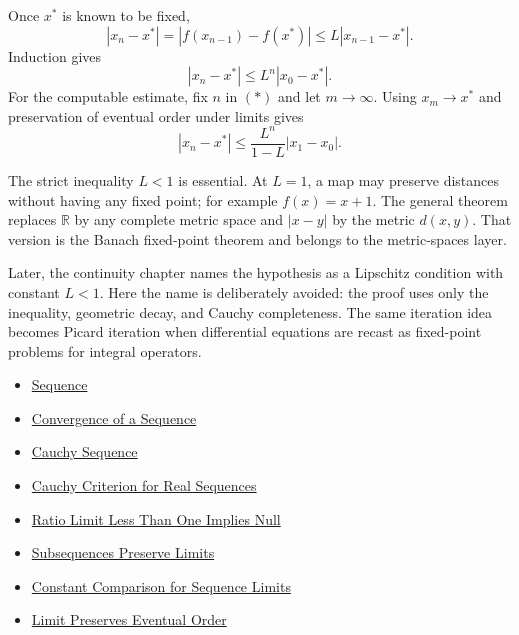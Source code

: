 \begin{remark*}[Interpretation]
Once \(x^\ast\) is known to be fixed,
\[
  |x_n-x^\ast|
  =
  |f(x_{n-1})-f(x^\ast)|
  \le
  L|x_{n-1}-x^\ast|.
\]
Induction gives
\[
  |x_n-x^\ast|\le L^n|x_0-x^\ast|.
\]
For the computable estimate, fix \(n\) in \((\ast)\) and let \(m\to\infty\).
Using \(x_m\to x^\ast\) and preservation of eventual order under limits gives
\[
  |x_n-x^\ast|
  \le
  \frac{L^n}{1-L}|x_1-x_0|.
\]
\end{remark*}

\begin{remark*}[Interpretation]
The strict inequality \(L<1\) is essential. At \(L=1\), a map may preserve
distances without having any fixed point; for example \(f(x)=x+1\). The
general theorem replaces \(\mathbb{R}\) by any complete metric space and
\(|x-y|\) by the metric \(d(x,y)\). That version is the Banach fixed-point
theorem and belongs to the metric-spaces layer.
\end{remark*}

\begin{remark*}[Interpretation]
Later, the continuity chapter names the hypothesis as a Lipschitz condition
with constant \(L<1\). Here the name is deliberately avoided: the proof uses
only the inequality, geometric decay, and Cauchy completeness. The same
iteration idea becomes Picard iteration when differential equations are
recast as fixed-point problems for integral operators.
\end{remark*}

\begin{remark*}[Interpretation]
\begin{itemize}
  \item \hyperref[def:sequence]{Sequence}
  \item \hyperref[def:convergent-sequence]{Convergence of a Sequence}
  \item \hyperref[def:cauchy-sequence]{Cauchy Sequence}
\end{itemize}
\end{remark*}

\begin{remark*}[Interpretation]
\begin{itemize}
  \item \hyperref[thm:cauchy-criterion-real-sequences]{Cauchy Criterion for Real Sequences}
  \item \hyperref[thm:ratio-limit-less-than-one-implies-null]{Ratio Limit Less Than One Implies Null}
  \item \hyperref[thm:subsequences-preserve-limits]{Subsequences Preserve Limits}
  \item \hyperref[thm:constant-comparison-sequence-limits]{Constant Comparison for Sequence Limits}
  \item \hyperref[thm:limit-preserves-eventual-order]{Limit Preserves Eventual Order}
\end{itemize}
\end{remark*}


